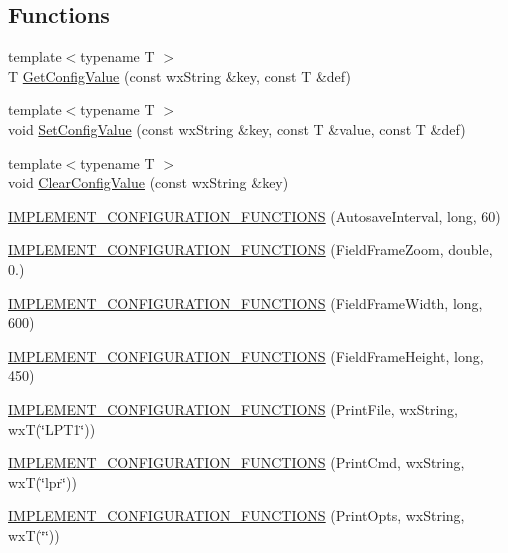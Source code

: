 \subsection*{Functions}
\begin{DoxyCompactItemize}
\item 
{\footnotesize template$<$typename T $>$ }\\T \hyperlink{a00190_a860aabd3721f09397ffb1e66c2e8980b}{Get\-Config\-Value} (const wx\-String \&key, const T \&def)
\item 
{\footnotesize template$<$typename T $>$ }\\void \hyperlink{a00190_aa6e82ce7754aaadddf73f1db43134a14}{Set\-Config\-Value} (const wx\-String \&key, const T \&value, const T \&def)
\item 
{\footnotesize template$<$typename T $>$ }\\void \hyperlink{a00190_acf6e3cdf59509e4e223358cc0b688fe6}{Clear\-Config\-Value} (const wx\-String \&key)
\item 
\hyperlink{a00190_a006c5177805a633cdea1ed3988ce2e8e}{I\-M\-P\-L\-E\-M\-E\-N\-T\-\_\-\-C\-O\-N\-F\-I\-G\-U\-R\-A\-T\-I\-O\-N\-\_\-\-F\-U\-N\-C\-T\-I\-O\-N\-S} (Autosave\-Interval, long, 60)
\item 
\hyperlink{a00190_ab4ecc294995f0384cafcc17fee1adce1}{I\-M\-P\-L\-E\-M\-E\-N\-T\-\_\-\-C\-O\-N\-F\-I\-G\-U\-R\-A\-T\-I\-O\-N\-\_\-\-F\-U\-N\-C\-T\-I\-O\-N\-S} (Field\-Frame\-Zoom, double, 0.)
\item 
\hyperlink{a00190_a73792c0067228d7cfb77d712cafaf6c5}{I\-M\-P\-L\-E\-M\-E\-N\-T\-\_\-\-C\-O\-N\-F\-I\-G\-U\-R\-A\-T\-I\-O\-N\-\_\-\-F\-U\-N\-C\-T\-I\-O\-N\-S} (Field\-Frame\-Width, long, 600)
\item 
\hyperlink{a00190_ace0ecd8d3139e72dfc2ef973c651b104}{I\-M\-P\-L\-E\-M\-E\-N\-T\-\_\-\-C\-O\-N\-F\-I\-G\-U\-R\-A\-T\-I\-O\-N\-\_\-\-F\-U\-N\-C\-T\-I\-O\-N\-S} (Field\-Frame\-Height, long, 450)
\item 
\hyperlink{a00190_a918a50b1e985a6486b536936cb50a221}{I\-M\-P\-L\-E\-M\-E\-N\-T\-\_\-\-C\-O\-N\-F\-I\-G\-U\-R\-A\-T\-I\-O\-N\-\_\-\-F\-U\-N\-C\-T\-I\-O\-N\-S} (Print\-File, wx\-String, wx\-T(\char`\"{}L\-P\-T1\char`\"{}))
\item 
\hyperlink{a00190_ad927a5137b6657bba8c2c8c89448eac5}{I\-M\-P\-L\-E\-M\-E\-N\-T\-\_\-\-C\-O\-N\-F\-I\-G\-U\-R\-A\-T\-I\-O\-N\-\_\-\-F\-U\-N\-C\-T\-I\-O\-N\-S} (Print\-Cmd, wx\-String, wx\-T(\char`\"{}lpr\char`\"{}))
\item 
\hyperlink{a00190_a9aace3a035e467cfdfadab3c1718ea33}{I\-M\-P\-L\-E\-M\-E\-N\-T\-\_\-\-C\-O\-N\-F\-I\-G\-U\-R\-A\-T\-I\-O\-N\-\_\-\-F\-U\-N\-C\-T\-I\-O\-N\-S} (Print\-Opts, wx\-String, wx\-T(\char`\"{}\char`\"{}))

\end{DoxyCompactItemize}
